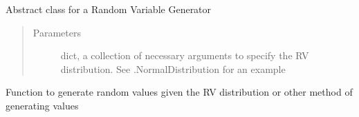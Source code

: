 \documentclass[letterpaper,10pt,english]{sphinxmanual}
\begin{document}
\begin{fulllineitems}
\label{\detokenize{simulation:risk_dash.simgen._RandomGen}}
\sphinxAtStartPar
Abstract class for a Random Variable Generator
\begin{quote}\begin{description}
\item[{Parameters}] \leavevmode
\sphinxAtStartPar
{} \textendash{} dict, a collection of necessary arguments to specify the RV distribution. See .NormalDistribution for an example

\end{description}\end{quote}

\begin{fulllineitems}
\label{\detokenize{simulation:risk_dash.simgen._RandomGen.generate}}
\sphinxAtStartPar
Function to generate random values given the RV distribution or other method of generating values

\end{fulllineitems}


\end{fulllineitems}

\end{document}
